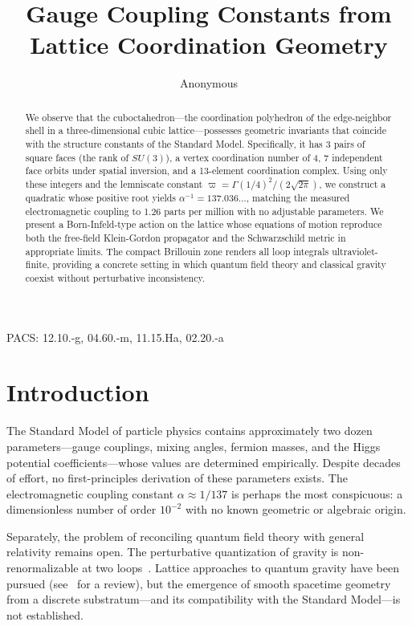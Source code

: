 \documentclass[12pt,a4paper]{article}
\title{\textbf{Gauge Coupling Constants from Lattice Coordination Geometry}}
\author{Anonymous}
\date{}
\newcommand{\vpi}{\varpi}
\begin{document}
\maketitle

\begin{abstract}
We observe that the cuboctahedron---the coordination polyhedron of the edge-neighbor shell in a three-dimensional cubic lattice---possesses geometric invariants that coincide with the structure constants of the Standard Model. Specifically, it has 3 pairs of square faces (the rank of $SU(3)$), a vertex coordination number of 4, 7 independent face orbits under spatial inversion, and a 13-element coordination complex. Using only these integers and the lemniscate constant $\vpi = \Gamma(1/4)^{2}/(2\sqrt{2\pi})$, we construct a quadratic whose positive root yields $\alpha^{-1} = 137.036\ldots$, matching the measured electromagnetic coupling to 1.26 parts per million with no adjustable parameters. We present a Born-Infeld-type action on the lattice whose equations of motion reproduce both the free-field Klein-Gordon propagator and the Schwarzschild metric in appropriate limits. The compact Brillouin zone renders all loop integrals ultraviolet-finite, providing a concrete setting in which quantum field theory and classical gravity coexist without perturbative inconsistency.
\end{abstract}

\noindent PACS: 12.10.-g, 04.60.-m, 11.15.Ha, 02.20.-a

\section{Introduction}

The Standard Model of particle physics contains approximately two dozen parameters---gauge couplings, mixing angles, fermion masses, and the Higgs potential coefficients---whose values are determined empirically. Despite decades of effort, no first-principles derivation of these parameters exists. The electromagnetic coupling constant $\alpha \approx 1/137$ is perhaps the most conspicuous: a dimensionless number of order $10^{-2}$ with no known geometric or algebraic origin.

Separately, the problem of reconciling quantum field theory with general relativity remains open. The perturbative quantization of gravity is non-renormalizable at two loops~\cite{GoroffSagnotti}. Lattice approaches to quantum gravity have been pursued (see~\cite{Ambjorn} for a review), but the emergence of smooth spacetime geometry from a discrete substratum---and its compatibility with the Standard Model---is not established.
\end{document}
